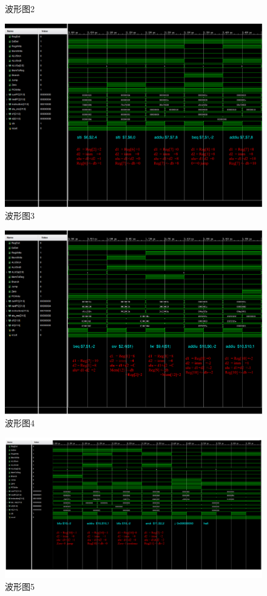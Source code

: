 \documentclass[12pt,UTF8]{ctexart}
\begin{document}
\begin{spacing}{1.1}
\begin{figure}[H]
\caption{波形图2}
\label{fig:wave_2}
\end{figure}
\begin{figure}[H]
\includegraphics[width=\linewidth,trim=0 130 0 0,clip]{fig/FullIns3.pdf}
\caption{波形图3}
\label{fig:wave_3}
\end{figure}
\begin{figure}[H]
\includegraphics[width=\linewidth,trim=0 120 0 0,clip]{fig/FullIns4.pdf}
\caption{波形图4}
\label{fig:wave_4}
\end{figure}
\begin{figure}[H]
\includegraphics[width=\linewidth,trim=0 100 0 0,clip]{fig/FullIns5.pdf}
\caption{波形图5}
\label{fig:wave_5}
\end{figure}


\end{spacing}
\end{document}
